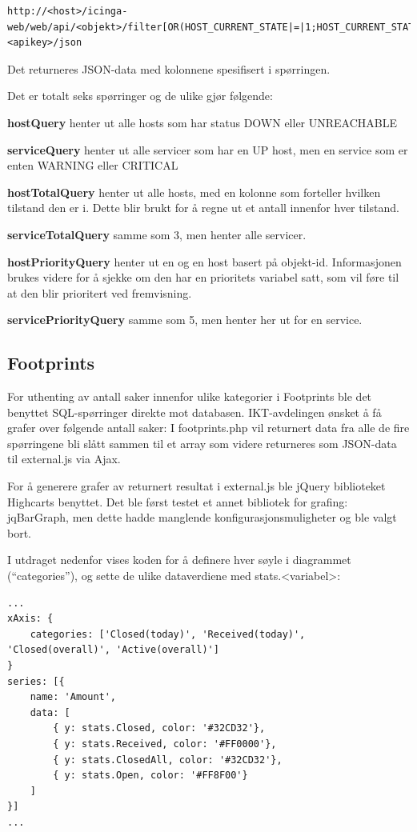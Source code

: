 \begin{lstlisting}[style=example]
http://<host>/icinga-web/web/api/<objekt>/filter[OR(HOST_CURRENT_STATE|=|1;HOST_CURRENT_STATE|=|2)]/columns[HOST_ID|HOST_CURRENT_CHECK_ATTEMPT|...]/authkey=<apikey>/json
\end{lstlisting}
Det returneres JSON-data med kolonnene spesifisert i spørringen.

Det er totalt seks spørringer og de ulike gjør følgende:
\begin{enumerate*}\label{sporringer}
	\item  \textbf{hostQuery} henter ut alle hosts som har status DOWN eller UNREACHABLE
	\item  \textbf{serviceQuery} henter ut alle servicer som har en UP host, men en service som er enten WARNING eller CRITICAL
	\item  \textbf{hostTotalQuery} henter ut alle hosts, med en kolonne som forteller hvilken tilstand den er i. Dette blir brukt for å regne ut et antall innenfor hver tilstand.
	\item  \textbf{serviceTotalQuery} samme som 3, men henter alle servicer.
	\item  \textbf{hostPriorityQuery} henter ut en og en host basert på objekt-id. Informasjonen brukes videre for å sjekke om den har en prioritets variabel satt, som vil føre til at den blir prioritert ved fremvisning.
	\item  \textbf{servicePriorityQuery} samme som 5, men henter her ut for en service.
\end{enumerate*}

\subsection{Footprints}
For uthenting av antall saker innenfor ulike kategorier i Footprints ble det benyttet SQL-spørringer direkte mot databasen. IKT-avdelingen ønsket å få grafer over følgende antall saker:
I footprints.php vil returnert data fra alle de fire spørringene bli slått sammen til et array som videre returneres som JSON-data til external.js via Ajax. 

For å generere grafer av returnert resultat i external.js ble jQuery biblioteket Highcarts benyttet. Det ble først testet et annet bibliotek for grafing: jqBarGraph, men dette hadde manglende konfigurasjonsmuligheter og ble valgt bort. 

I utdraget nedenfor vises koden for å definere hver søyle i diagrammet (``categories''), og sette de ulike dataverdiene med stats.<variabel>:
\begin{lstlisting}
...
xAxis: {
    categories: ['Closed(today)', 'Received(today)', 'Closed(overall)', 'Active(overall)']
}
series: [{
    name: 'Amount',
    data: [
        { y: stats.Closed, color: '#32CD32'},
        { y: stats.Received, color: '#FF0000'},
        { y: stats.ClosedAll, color: '#32CD32'},
        { y: stats.Open, color: '#FF8F00'}
    ]
}]
...
\end{lstlisting}

